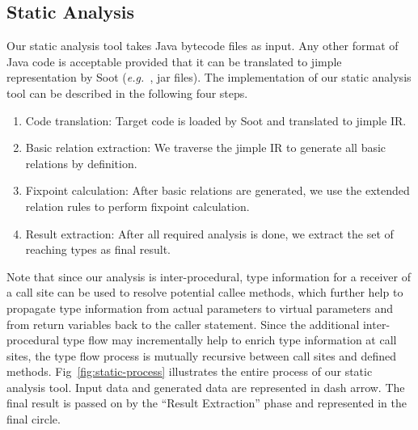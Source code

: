 \documentclass{fac}
\newcommand\eg{\textit{e.g.\ }}
\begin{document}

\subsection{Static Analysis}\label{subsec:static-analysis-tool}
Our static analysis tool %
takes Java bytecode files as input. Any other format of Java code is acceptable provided that it can be translated to jimple representation by Soot (\eg, jar files). The implementation of our static analysis tool can be described in the following four steps. %
\begin{enumerate}
\item Code translation:
Target code is loaded by Soot and translated to jimple IR. %
\item Basic relation extraction: %
We traverse the %
jimple IR to generate all basic relations by definition.
\item Fixpoint calculation:
After basic relations are generated, we use the extended relation rules to perform fixpoint calculation.
\item Result extraction:
After all required analysis is done, we extract the set of reaching types as final result.
\end{enumerate}
Note that since our analysis is inter-procedural, type information for a receiver of a call site can be used to resolve potential callee methods, which further help to propagate type information from actual parameters to virtual parameters and from return variables back to the caller statement. Since the additional inter-procedural type flow may incrementally help to enrich type information at call sites, the type flow process is mutually recursive between call sites and defined methods. %
Fig~\ref{fig:static-process} illustrates the entire process of our static analysis tool. Input data and generated data are represented in dash arrow. The final result is passed on by the ``Result Extraction'' phase and represented in the final circle.
\end{document}
